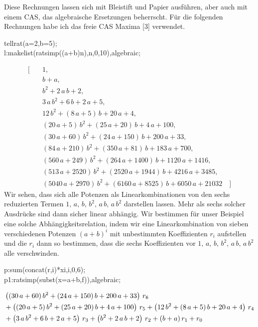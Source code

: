 \documentclass[11pt,a4paper]{article}
\newcommand{\cas}[1]{{\sc #1}}
\begin{document}
Diese Rechnungen lassen sich mit Bleistift und Papier ausführen, aber auch mit
einem CAS, das algebraische Ersetzungen beherrscht. Für die folgenden
Rechnungen habe ich das freie CAS \cas{Maxima} [3] verwendet.
\begin{code}
tellrat(a=2,b=5);\\
l:makelist(ratsimp((a+b){\pw}n),n,0,10),algebraic;
\end{code}
\begin{align*}
\Big[\quad & 1,\\ 
& b+a,\\ 
& b^2+2\,a\,b+2,\\ 
& 3\,a\,b^2+6\,b+2\,a+5,\\ 
& 12\,b^2+(8\,a+5)\,b+20\,a+4,\\ 
& (20\,a+5)\,b^2+(25 \,a+20)\,b+4\,a+100,\\
& (30\,a+60)\,b^2+(24\,a+ 150)\,b+200\,a+33,\\
& (84\,a+210)\,b^2+(350\,a+ 81)\,b+183\,a+700,\\
& (560\,a+249)\,b^2+(264\,a+ 1400)\,b+1120\,a+1416,\\
& (513\,a+2520)\,b^2+(2520\,a+1944)\,b+4216\,a+3485,\\
& (5040\,a+2970)\,b^2 +(6160\,a+8525)\,b+6050\,a+21032\quad \Big]
\end{align*}
Wir sehen, dass sich alle Potenzen als Linearkombinationen von den sechs
reduzierten Termen $1,\,a,\,b,\,b^2,\,a\,b,\,a\,b^2$ darstellen lassen. Mehr
als sechs solcher Ausdrücke sind dann sicher linear abhängig. Wir bestimmen für
unser Beispiel eine solche Abhängigkeitsrelation, indem wir eine
Linearkombination von sieben verschiedenen Potenzen $(a+b)^i$ mit unbestimmten
Koeffizienten $r_i$ aufstellen und die $r_i$ dann so bestimmen, dass die sechs
Koeffizienten vor $1,\,a,\,b,\,b^2,\,a\,b,\,a\,b^2$ alle verschwinden. 
\begin{code}
 p:sum(concat(r,i)*x{\pw}i,i,0,6);\\
 p1:ratsimp(subst(x=a+b,f)),algebraic;
\end{code}
\begin{align*}
  &\left((30\,a+60)\,b^2+(24\,a+150)\,b+200\,a+33\right)\,{r_6}\\
  &+\left((20\,a+5)\,b^2+(25\,a+20 )\,b+4\,a+100\right)\,{r_5}
  +\left(12\,b^2+(8\,a+5 )\,b+20\,a+4\right)\,{r_4}\\
  &+\left(3\,a\,b^2+6\,b+2\,a+5\right)\,{r_3} +\left(b^2+2\,a\,b+2\right)\,{r_2}
  +(b+a)\,{r_1}+{r_0}
\end{align*}
\end{document}
